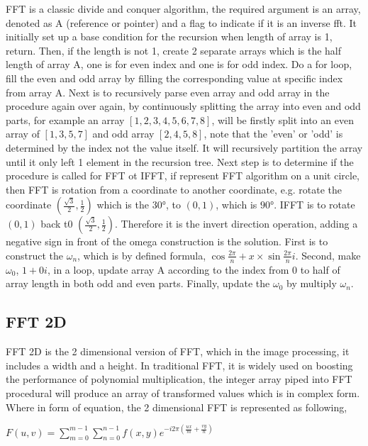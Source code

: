 \documentclass[12pt]{article}
\begin{document}
			FFT is a classic divide and conquer algorithm, the required argument is an array, denoted as A (reference or pointer) and a flag to indicate if it is an inverse fft. It initially set up a base condition for the recursion when length of array is 1, return. Then, if the length is not 1, create 2 separate arrays which is the half length of array A, one is for even index and one is for odd index. Do a for loop, fill the even and odd array by filling the corresponding value at specific index from array A. Next is to recursively parse even array and odd array in the procedure again over again, by continuously splitting the array into even and odd parts, for example an array $[1, 2, 3, 4, 5, 6, 7, 8]$, will be firstly split into an even array of $[1, 3, 5, 7]$ and odd array $[2, 4, 5, 8]$, note that the 'even' or 'odd' is determined by the index not the value itself. It will recursively partition the array until it only left 1 element in the recursion tree. Next step is to determine if the procedure is called for FFT ot IFFT, if represent FFT algorithm on a unit circle, then FFT is rotation from a coordinate to another coordinate, e.g. rotate the coordinate $(\frac{\sqrt{3}}{2}, \frac{1}{2})$ which is the $\ang{30}$, to $(0, 1)$, which is $\ang{90}$. IFFT is to rotate $(0, 1)$ back t0 $(\frac{\sqrt{3}}{2}, \frac{1}{2})$. Therefore it is the invert direction operation, adding a negative sign in front of the omega construction is the solution. First is to construct the $\omega_{n}$, which is by defined formula, $\cos \frac{2\pi}{n} + x \times \sin \frac{2\pi}{n}i$. Second, make $\omega_{0}$, $1 + 0i$, in a loop, update array A according to the index from 0 to half of array length in both odd and even parts. Finally, update the $\omega_{0}$ by multiply $\omega_{n}$. 
		
		\subsection{FFT 2D}
		
			FFT 2D is the 2 dimensional version of FFT, which in the image processing, it includes a width and a height. In traditional FFT, it is widely used on boosting the performance of polynomial multiplication, the integer array piped into FFT procedural will produce an array of transformed values which is in complex form. Where in form of equation, the 2 dimensional FFT is represented as following,
			
			\begin{center}
				\centering
				
				$F(u, v) = \sum_{m=0}^{m-1} \sum_{n=0}^{n-1} f(x,y) e^{-i2\pi (\frac{ux}{m} + \frac{vy}{n})}$
			\end{center}
		
\end{document}
